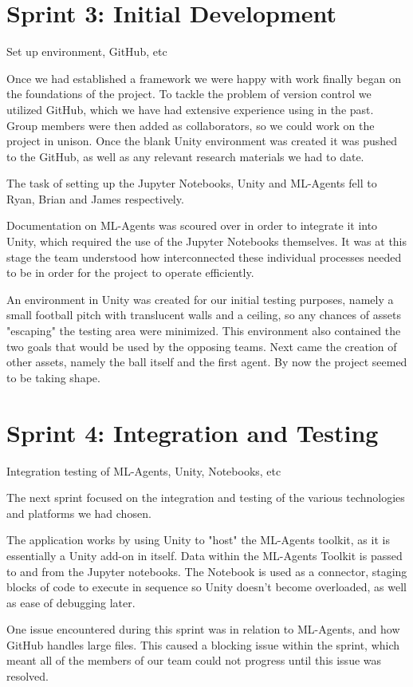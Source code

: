 \section{Sprint 3: Initial Development}
	Set up environment, GitHub, etc
	
	Once we had established a framework we were happy with work finally began on the foundations of the project. To tackle the problem of version control we utilized GitHub, which we have had extensive experience using in the past. Group members were then added as collaborators, so we could work on the project in unison.  Once the blank Unity environment was created it was pushed to the GitHub, as well as any relevant research materials we had to date.
	
	The task of setting up the Jupyter Notebooks, Unity and ML-Agents fell to Ryan, Brian and James respectively.
	
	Documentation on ML-Agents was scoured over in order to integrate it into Unity, which required the use of the Jupyter Notebooks themselves. It was at this stage the team understood how interconnected these individual processes needed to be in order for the project to operate efficiently.
	
	An environment in Unity was created for our initial testing purposes, namely a small football pitch with translucent walls and a ceiling, so any chances of assets "escaping" the testing area were minimized. This environment also contained the two goals that would be used by the opposing teams. Next came the creation of other assets, namely the ball itself and the first agent. By now the project seemed to be taking shape.
	

\section{Sprint 4: Integration and Testing}
	Integration testing of ML-Agents, Unity, Notebooks, etc
	
	The next sprint focused on the integration and testing of the various technologies and platforms we had chosen. 
	
	The application works by using Unity to "host" the ML-Agents toolkit, as it is essentially a Unity add-on in itself. Data within the ML-Agents Toolkit is passed to and from the Jupyter notebooks. The Notebook is used as a connector, staging blocks of code to execute in sequence so Unity doesn't become overloaded, as well as ease of debugging later.
	
	One issue encountered during this sprint was in relation to ML-Agents, and how GitHub handles large files. This caused a blocking issue within the sprint, which meant all of the members of our team could not progress until this issue was resolved. 
	
